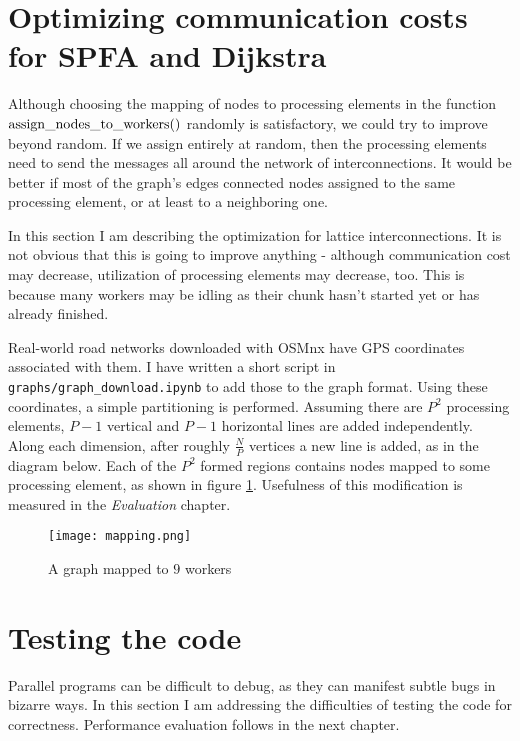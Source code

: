 \documentclass[12pt,a4paper,oneside,openright]{report}
\begin{document}

\section{Optimizing communication costs for SPFA and Dijkstra}
Although choosing the mapping of nodes to processing elements in the function $\rm{assign\_nodes\_to\_workers()}$ randomly is satisfactory, we could try to improve beyond random. If we assign entirely at random, then the processing elements need to send the messages all around the network of interconnections. It would be better if most of the graph's edges connected nodes assigned to the same processing element, or at least to a neighboring one.

In this section I am describing the optimization for lattice interconnections. It is not obvious that this is going to improve anything - although communication cost may decrease, utilization of processing elements may decrease, too. This is because many workers may be idling as their chunk hasn't started yet or has already finished. 

Real-world road networks downloaded with OSMnx have GPS coordinates associated with them. I have written a short script in \texttt{graphs/graph\_download.ipynb} to add those to the graph format. Using these coordinates, a simple partitioning is performed. Assuming there are $P^2$ processing elements, $P-1$ vertical and $P-1$ horizontal lines are added independently. Along each dimension, after roughly $\frac{N}{P}$ vertices a new line is added, as in the diagram below. Each of the $P^2$ formed regions contains nodes mapped to some processing element, as shown in figure \ref{mapping}. Usefulness of this modification is measured in the \textit{Evaluation} chapter.

\begin{figure}[ht]
\centering
\texttt{[image: mapping.png]}
\caption{A graph mapped to $9$ workers}
\label{mapping}
\end{figure}

\section{Testing the code}
Parallel programs can be difficult to debug, as they can manifest subtle bugs in bizarre ways. In this section I am addressing the difficulties of testing the code for correctness. Performance evaluation follows in the next chapter.
\end{document}
